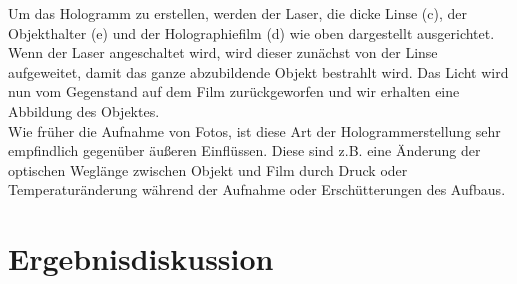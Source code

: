 Um das Hologramm zu erstellen, werden der Laser, die dicke Linse (c), der Objekthalter (e) und der Holographiefilm (d) wie oben dargestellt ausgerichtet. \\
Wenn der Laser angeschaltet wird, wird dieser zunächst von der Linse aufgeweitet, damit das ganze abzubildende Objekt bestrahlt wird. Das Licht wird nun vom Gegenstand auf dem Film zurückgeworfen und wir erhalten eine Abbildung des Objektes. \\
Wie früher die Aufnahme von Fotos, ist diese Art der Hologrammerstellung sehr empfindlich gegenüber äußeren Einflüssen. Diese sind z.B. eine Änderung der optischen Weglänge zwischen Objekt und Film durch Druck oder Temperaturänderung während der Aufnahme oder Erschütterungen des Aufbaus. 


\section{Ergebnisdiskussion}







